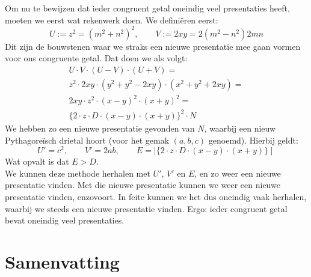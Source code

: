 \documentclass[12pt,reqno]{article}
\theoremstyle{theorem}
\theoremstyle{definition}
\begin{document}
	Om nu te bewijzen dat ieder congruent getal oneindig veel presentaties heeft, moeten we eerst wat rekenwerk doen. We defini\"eren eerst:
	\begin{equation}
		U:= z^2=(m^2+n^2)^2, \qquad V:= 2xy=2(m^2-n^2)2mn
	\end{equation}
	Dit zijn de bouwstenen waar we straks een nieuwe presentatie mee gaan vormen voor ons congruente getal. Dat doen we als volgt:
	\begin{align}
			U\cdot V \cdot (U-V) \cdot (U+V)=\\
			z^2\cdot 2xy\cdot (y^2+y^2-2xy)\cdot (x^2+y^2+2xy)=\\
			2xy\cdot z^2\cdot (x-y)^2\cdot (x+y)^2=\\
			\{2\cdot z\cdot D\cdot (x-y)\cdot (x+y)\}^2\cdot N
	\end{align}
	We hebben zo een nieuwe presentatie gevonden van $N$, waarbij een nieuw Pythagore\"isch drietal hoort (voor het gemak $(a,b,c)$ genoemd). Hierbij geldt:
	\begin{equation}
		U'=c^2, \qquad V'=2ab, \qquad E= \mid \{2\cdot z\cdot D\cdot (x-y)\cdot (x+y)\} \mid
	\end{equation}
	Wat opvalt is dat $E>D$.\\
	
	We kunnen deze methode herhalen met $U'$, $V'$ en $E$, en zo weer een nieuwe presentatie vinden. Met die nieuwe presentatie kunnen we weer een nieuwe presentatie vinden, enzovoort. In feite kunnen we het dus oneindig vaak herhalen, waarbij we steeds een nieuwe presentatie vinden. Ergo: ieder congruent getal bevat oneindig veel presentaties.
	
	
	\section{Samenvatting}
	
	
	
	
\end{document}
